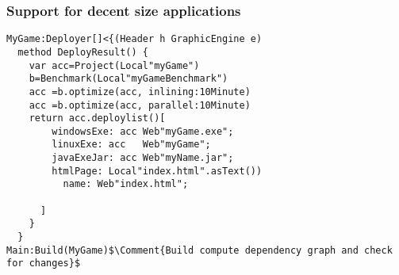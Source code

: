 \begin{frame}[fragile]
\frametitle{Support for decent size applications}
\begin{NiceCode}{59ex}{0.8}
\begin{lstlisting}
MyGame:Deployer[]<{(Header h GraphicEngine e)
  method DeployResult() {
    var acc=Project(Local"myGame")
    b=Benchmark(Local"myGameBenchmark")
    acc =b.optimize(acc, inlining:10Minute)
    acc =b.optimize(acc, parallel:10Minute)
    return acc.deploylist()[
        windowsExe: acc Web"myGame.exe";
        linuxExe: acc   Web"myGame";
        javaExeJar: acc Web"myName.jar";
        htmlPage: Local"index.html".asText())
          name: Web"index.html";
      
      ]
    }
  }
Main:Build(MyGame)$\Comment{Build compute dependency graph and check for changes}$
\end{lstlisting}
\end{NiceCode}
\end{frame}






%
%
%


